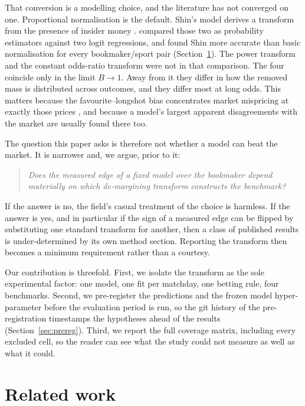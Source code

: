 \documentclass[11pt,a4paper]{article}
\begin{document}
That conversion is a modelling choice, and the literature has not converged on
one. Proportional normalisation is the default. Shin's model derives a
transform from the presence of insider money \citep{shin1991,shin1993}.
\citet{strumbelj2014} compared those two as probability estimators against two
logit regressions, and found Shin more accurate than basic normalisation for
every bookmaker/sport pair (Section~\ref{sec:related}). The power transform
\citep{clarke2017} and the constant odds-ratio transform \citep{cheung2015}
were not in that comparison. The four coincide only in the limit $B \to 1$. Away from it
they differ in how the removed mass is distributed across outcomes, and they
differ most at long odds. This matters because the favourite--longshot bias
concentrates market mispricing at exactly those prices \citep{cain2000}, and
because a model's largest apparent disagreements with the market are usually
found there too.

The question this paper asks is therefore not whether a model can beat the
market. It is narrower and, we argue, prior to it:

\begin{quote}
\emph{Does the measured edge of a fixed model over the bookmaker depend
materially on which de-margining transform constructs the benchmark?}
\end{quote}

If the answer is no, the field's casual treatment of the choice is harmless. If the answer is yes, and in particular if the sign of a measured edge can be
flipped by substituting one standard transform for another, then a class of
published results is under-determined by its own method section. Reporting
the transform then becomes a minimum requirement rather than a courtesy.

Our contribution is threefold. First, we isolate the transform as the sole
experimental factor: one model, one fit per matchday, one betting rule, four
benchmarks. Second, we pre-register the predictions and the frozen model
hyper-parameter before the evaluation period is run, so the git history of the
pre-registration timestamps the hypotheses ahead of the results
(Section~\ref{sec:prereg}). Third, we report the full coverage matrix,
including every excluded cell, so the reader can see what the study could not
measure as well as what it could.

\section{Related work}
\label{sec:related}
\end{document}
